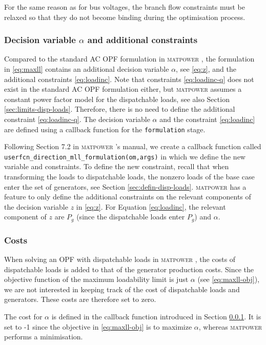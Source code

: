 \documentclass[12pt,a4]{article}
\newcommand*{\codemat}[1]{\texttt{#1}}
\newcommand*{\matpower}{\textsc{matpower} }
\begin{document}
For the same reason as for bus voltages, the branch flow constraints must be relaxed so that they do not become binding during the optimisation process.

\subsubsection{Decision variable $\alpha$ and additional constraints}
\label{sec:defin-vari-alpha}

Compared to the standard AC OPF formulation in \matpower, the formulation in \eqref{eq:maxll} contains an additional decision variable $\alpha$, see \eqref{eq:z}, and the additional constraints \eqref{eq:loadinc}.
Note that constraints \eqref{eq:loadinc-q} does not exist in the standard AC OPF formulation either, but \matpower assumes a constant power factor model for the dispatchable loads, see also Section \ref{sec:limits-disp-loads}.
Therefore, there is no need to define the additional constraint \eqref{eq:loadinc-q}.
The decision variable $\alpha$ and the constraint \eqref{eq:loadinc} are defined using a callback function for the \codemat{formulation} stage.

Following Section 7.2 in \matpower's manual, we create a callback function called \codemat{userfcn\_direction\_mll\_formulation(om,args)} in which we define the new variable and constraints.
To define the new constraint, recall that when transforming the loads to dispatchable loads, the nonzero loads of the base case enter the set of generators, see Section \ref{sec:defin-disp-loads}.
\matpower has a feature to only define the additional constraints on the relevant components of the decision variable $z$ in \eqref{eq:z}.
For Equation \eqref{eq:loadinc}, the relevant component of $z$ are $P_g$ (since the dispatchable loads enter $P_g$) and $\alpha$.

\subsubsection{Costs}
\label{sec:costs}

When solving an OPF with dispatchable loads in \matpower, the costs of dispatchable loads is added to that of the generator production costs.
Since the objective function of the maximum loadability limit is just $\alpha$ (see \eqref{eq:maxll-obj}), we are not interested in keeping track of the cost of dispatchable loads and generators.
These costs are therefore set to zero.

The cost for $\alpha$ is defined in the callback function introduced in Section \ref{sec:defin-vari-alpha}.
It is set to -1 since the objective in \eqref{eq:maxll-obj} is to maximize $\alpha$, whereas \matpower performs a minimisation.
\end{document}
